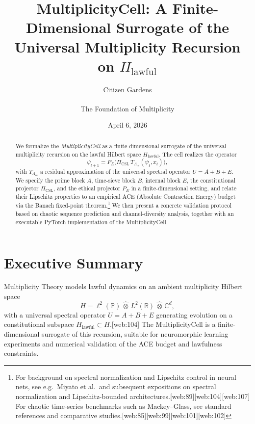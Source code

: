 \documentclass[11pt]{article}
\title{MultiplicityCell: A Finite-Dimensional Surrogate of the Universal Multiplicity Recursion on $H_{\mathrm{lawful}}$}
\author{Citizen Gardens \\ \\ The Foundation of Multiplicity}
\date{April 6, 2026}
\theoremstyle{definition}
\theoremstyle{plain}
\begin{document}
\maketitle

\begin{abstract}
We formalize the \emph{MultiplicityCell} as a finite-dimensional surrogate of the universal multiplicity recursion on the lawful Hilbert space $H_{\mathrm{lawful}}$.
The cell realizes the operator
\[
  \psi_{t+1} = P_E\bigl(\Pi_{\mathrm{CSL}}\,T_{\Lambda_m}(\psi_t, x_t)\bigr),
\]
with $T_{\Lambda_m}$ a residual approximation of the universal spectral operator $U = A + B + E$.
We specify the prime block $A$, time-sieve block $B$, internal block $E$, the constitutional projector $\Pi_{\mathrm{CSL}}$, and the ethical projector $P_E$ in a finite-dimensional setting, and relate their Lipschitz properties to an empirical ACE (Absolute Contraction Energy) budget via the Banach fixed-point theorem.\footnote{For background on spectral normalization and Lipschitz control in neural nets, see e.g.\ Miyato et al.\ and subsequent expositions on spectral normalization and Lipschitz-bounded architectures.[web:89][web:104][web:107] For chaotic time-series benchmarks such as Mackey--Glass, see standard references and comparative studies.[web:85][web:99][web:101][web:102]} 
We then present a concrete validation protocol based on chaotic sequence prediction and channel-diversity analysis, together with an executable PyTorch implementation of the MultiplicityCell.
\end{abstract}
\newpage
\tableofcontents
\newpage

\section*{Executive Summary}

Multiplicity Theory models lawful dynamics on an ambient multiplicity Hilbert space
\[
  H = \ell^2(\mathbb{P}) \,\widehat{\otimes}\, L^2(\mathbb{R}) \,\widehat{\otimes}\, \mathbb{C}^d,
\]
with a universal spectral operator $U = A + B + E$ generating evolution on a constitutional subspace $H_{\mathrm{lawful}} \subset H$.[web:104]
The MultiplicityCell is a finite-dimensional surrogate of this recursion, suitable for neuromorphic learning experiments and numerical validation of the ACE budget and lawfulness constraints.
\end{document}
